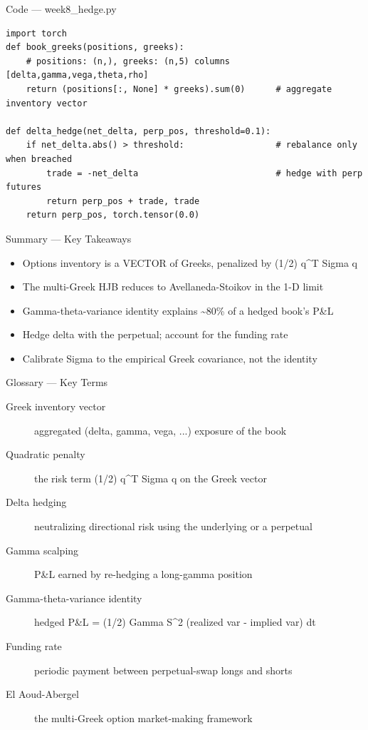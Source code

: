 \documentclass[aspectratio=169,10pt]{beamer}
\begin{document}
\begin{frame}[fragile]{Code --- week8\_hedge.py}
\begin{lstlisting}
import torch
def book_greeks(positions, greeks):
    # positions: (n,), greeks: (n,5) columns [delta,gamma,vega,theta,rho]
    return (positions[:, None] * greeks).sum(0)      # aggregate inventory vector

def delta_hedge(net_delta, perp_pos, threshold=0.1):
    if net_delta.abs() > threshold:                  # rebalance only when breached
        trade = -net_delta                           # hedge with perp futures
        return perp_pos + trade, trade
    return perp_pos, torch.tensor(0.0)
\end{lstlisting}
\end{frame}
\begin{frame}{Summary --- Key Takeaways}
\begin{itemize}
  \item Options inventory is a VECTOR of Greeks, penalized by (1/2) q\textasciicircum{}T Sigma q
  \item The multi-Greek HJB reduces to Avellaneda-Stoikov in the 1-D limit
  \item Gamma-theta-variance identity explains \textasciitilde{}80\% of a hedged book's P\&L
  \item Hedge delta with the perpetual; account for the funding rate
  \item Calibrate Sigma to the empirical Greek covariance, not the identity
\end{itemize}
\end{frame}

\begin{frame}{Glossary --- Key Terms}
\footnotesize\begin{description}
\item[\color{ncsured}Greek inventory vector] aggregated (delta, gamma, vega, ...) exposure of the book
\item[\color{ncsured}Quadratic penalty] the risk term (1/2) q\textasciicircum{}T Sigma q on the Greek vector
\item[\color{ncsured}Delta hedging] neutralizing directional risk using the underlying or a perpetual
\item[\color{ncsured}Gamma scalping] P\&L earned by re-hedging a long-gamma position
\item[\color{ncsured}Gamma-theta-variance identity] hedged P\&L = (1/2) Gamma S\textasciicircum{}2 (realized var - implied var) dt
\item[\color{ncsured}Funding rate] periodic payment between perpetual-swap longs and shorts
\item[\color{ncsured}El Aoud-Abergel] the multi-Greek option market-making framework
\end{description}
\end{frame}
\end{document}
